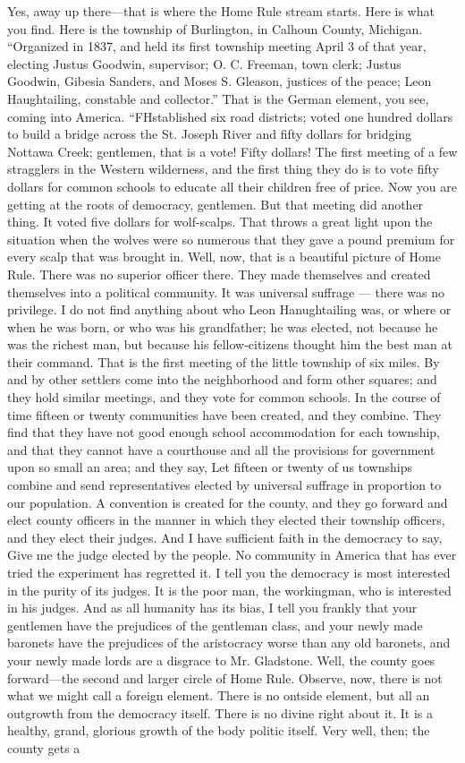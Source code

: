 \documentclass[11pt,openany]{book}
\begin{document}
Yes, away up there---that is where the Home Rule stream starts. Here is what you find. Here is the township of Burlington, in Calhoun County, Michigan. ``Organized in 1837, and held its first township meeting April 3 of that year, electing Justus Goodwin, supervisor; O. C. Freeman, town clerk; Justus Goodwin, Gibesia Sanders, and Moses S. Gleason, justices of the peace; Leon Haughtailing, constable and collector.'' That is the German element, you see, coming into America. ``FHstablished six road districts; voted one hundred dollars to build a bridge across the St. Joseph River and fifty dollars for bridging Nottawa Creek; gentlemen, that is a vote! Fifty dollars! The first meeting of a few stragglers in the Western wilderness, and the first thing they do is to vote fifty dollars for common schools to educate all their children free of price. Now you are getting at the roots of democracy, gentlemen. But that meeting did another thing. It voted five dollars for wolf-scalps. That throws a great light upon the situation when the wolves were so numerous that they gave a pound premium for every scalp that was brought in. Well, now, that is a beautiful picture of Home Rule. There was no superior officer there. They made themselves and created themselves into a political community. It was universal suffrage --- there was no privilege. I do not find anything about who Leon Hanughtailing was, or where or when he was born, or who was his grandfather; he was elected, not because he was the richest man, but because his fellow-citizens thought him the best man at their command. That is the first meeting of the little township of six miles. By and by other settlers come into the neighborhood and form other squares; and they hold similar meetings, and they vote for common schools. In the course of time fifteen or twenty communities have been created, and they combine. They find that they have not good enough school accommodation for each township, and that they cannot have a courthouse and all the provisions for government upon so small an area; and they say, Let fifteen or twenty of us townships combine and send representatives elected by universal suffrage in proportion to our population. A convention is created for the county, and they go forward and elect county officers in the manner in which they elected their township officers, and they elect their judges. And I have sufficient faith in the democracy to say, Give me the judge elected by the people. No community in America that has ever tried the experiment has regretted it. I tell you the democracy is most interested in the purity of its judges. It is the poor man, the workingman, who is interested in his judges. And as all humanity has its bias, I tell you frankly that your gentlemen have the prejudices of the gentleman class, and your newly made baronets have the prejudices of the aristocracy worse than any old baronets, and your newly made lords are a disgrace to Mr. Gladstone. Well, the county goes forward---the second and larger circle of Home Rule. Observe, now, there is not what we might call a foreign element. There is no ontside element, but all an outgrowth from the democracy itself. There is no divine right about it. It is a healthy, grand, glorious growth of the body politic itself. Very well, then; the county gets a 
\end{document}
